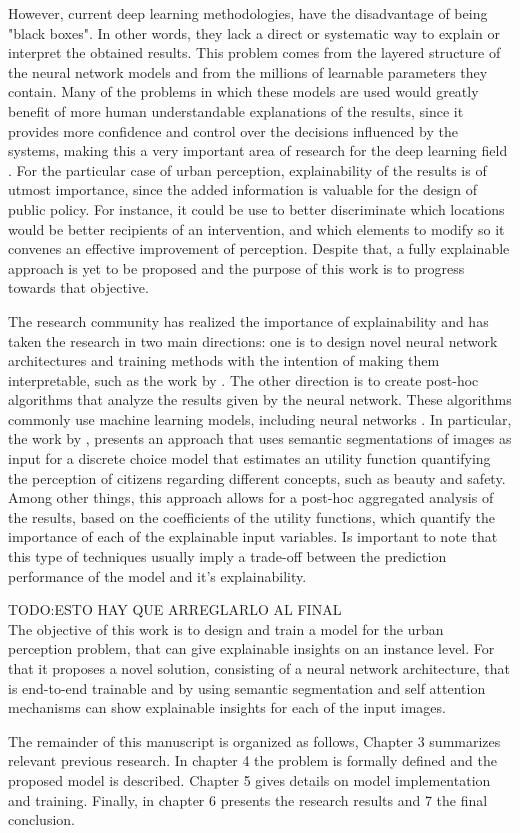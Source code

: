 However, current deep learning methodologies, have the disadvantage of being "black boxes". In other
words, they lack a direct or systematic way to explain or interpret the obtained results. This problem
comes from the layered structure of the neural network models and from the millions of learnable parameters
they contain. Many of the problems in which these models are used would greatly benefit of more
human understandable explanations of the results, since it provides more confidence and control
over the decisions influenced by the systems, making this a very important area of
research for the deep learning field \cite{adadi_xai, ras_explanation}. For the particular case of urban perception,
explainability of the results is of utmost importance, since the added information is valuable
for the design of public policy. For instance, it could be use to better discriminate which locations
would be better recipients of an intervention, and which elements to modify so it convenes
an effective improvement of perception. Despite that, a fully explainable approach is yet to be
proposed and the purpose of this work is to progress towards that objective.

The research community has realized the importance of explainability
and has taken the research in two main directions: one is to design novel
neural network architectures and training methods with the intention of making them interpretable,
such as the work by . The other
direction is to  create post-hoc algorithms \cite{adadi_xai} that analyze the results given by the
neural network. These algorithms commonly use machine learning models, including neural networks \cite{kim_ace}.
In particular, the work by , presents an approach that uses semantic segmentations of  images
\cite{segnet} as input for a discrete choice model that estimates an utility function quantifying the
perception of citizens regarding different concepts, such as beauty and safety.
Among other things, this approach allows for a post-hoc aggregated analysis of the results, based
on the coefficients of the utility functions, which quantify the importance of each of the explainable input variables.
Is important to note that this type of techniques usually imply
a trade-off between the prediction performance of the model
and it's explainability.

TODO:ESTO HAY QUE ARREGLARLO AL FINAL \\
The objective of this work is to design and train a model for the urban perception problem,
that can give explainable insights on an instance level. For that it proposes a novel solution,
consisting of a neural network architecture, that is end-to-end trainable and by using semantic
segmentation \cite{pspnet} and self attention mechanisms \cite{vaswani_attention} can show
explainable insights for each of the input images.

The remainder of this manuscript is organized as follows, Chapter 3 summarizes relevant previous research. In chapter 4
the problem is formally defined and the proposed model is described. Chapter 5 gives
details on model implementation and training. Finally, in chapter 6 presents the research results
and 7 the final conclusion.
